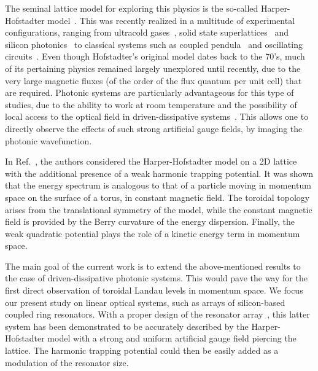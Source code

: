 \documentclass[twocolumn, 10pt, aps, superscriptaddress, floatfix, showpacs, pra, citeautoscript]{revtex4-1}
\newcommand{\co}[2]{#2}
\renewcommand{\paragraph}{\co}
\begin{document}
\paragraph{Experimental realisations of HH}
The seminal lattice model for exploring this physics is the so-called
Harper-Hofstadter
model~\cite{harper1955magnetic,hofstadter1976butterfly}. This was
recently realized in a multitude of experimental configurations,
ranging from ultracold
gases~\cite{aidelsburger2013hh,miyake2013hh,mancini2015edge,stuhl2015edge},
solid state superlattices~\cite{dean2013hofstadter,yu2014hierarchy}
and silicon photonics~\cite{hafezi2013imaging} to classical systems
such as coupled pendula~\cite{susstrunk2015pendula} and oscillating
circuits~\cite{jia2013circuits}. Even though Hofstadter's original
model dates back to the 70's, much of its pertaining physics remained
largely unexplored until recently, due to the very large magnetic
fluxes (of the order of the flux quantum per unit cell) that are
required.
Photonic systems are particularly advantageous for this type of
studies, due to the ability to work at room temperature and the
possibility of local access to the optical field in driven-dissipative
systems~\cite{carusotto2013fluids}. This allows one to directly
observe the effects of such strong artificial gauge fields, by imaging
the photonic wavefunction.

\paragraph{Momentum space dual of HH model provides new insights.}
In Ref.~, the authors considered the
Harper-Hofstadter model on a 2D lattice with the additional presence
of a weak harmonic trapping potential. It was shown that the energy
spectrum is analogous to that of a particle moving in momentum space
on the surface of a torus, in constant magnetic field.  The toroidal
topology arises from the translational symmetry of the model, while
the constant magnetic field is provided by the Berry curvature of the
energy dispersion. Finally, the weak quadratic potential plays the
role of a kinetic energy term in momentum space.

\paragraph{The main goal and its importance.}
The main goal of the current work is to extend the above-mentioned
results to the case of driven-dissipative photonic systems. This would
pave the way for the first direct observation of toroidal Landau
levels in momentum space.
We focus our present study on linear optical systems, such as arrays
of silicon-based coupled ring resonators.  With a proper design of the
resonator array~\cite{hafezi2013imaging}, this latter system has been
demonstrated to be accurately described by the Harper-Hofstadter model
with a strong and uniform artificial gauge field piercing the lattice.
The harmonic trapping potential could then be easily added as a
modulation of the resonator size.
\end{document}
